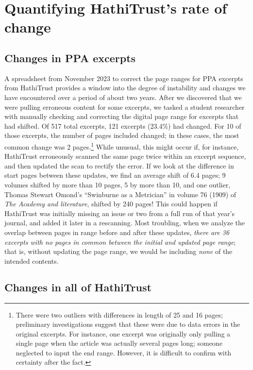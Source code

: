 \documentclass{anthology-ch}         %
\begin{document}
\section{Quantifying HathiTrust’s rate of change}

\subsection{Changes in PPA excerpts}

A spreadsheet from November 2023 to correct the page ranges for PPA excerpts from HathiTrust provides a window into the degree of instability and changes we have encountered over a period of about two years. After we discovered that we were pulling erroneous content for some excerpts, we tasked a student researcher with manually checking and correcting the digital page range for excerpts that had shifted. Of 517 total excerpts, 121 excerpts (23.4\%) had changed. For 10 of those excerpts, the number of pages included changed; in these cases, the most common change was 2 pages.\footnote{There were two outliers with differences in length of 25 and 16 pages; preliminary investigations suggest that these were due to data errors in the original excerpts. For instance, one excerpt was originally only pulling a single page when the article was actually several pages long; someone neglected to input the end range. However, it is difficult to confirm with certainty after the fact.} While unusual, this might occur if, for instance, HathiTrust erroneously scanned the same page twice within an excerpt sequence, and then updated the scan to rectify the error. If we look at the difference in start pages between these updates, we find an average shift of 6.4 pages; 9 volumes shifted by more than 10 pages, 5 by more than 10, and one outlier, Thomas Stewart Omond’s “Swinburne as a Metrician” in volume 76 (1909) of \textit{The Academy and literature}\cite{omond_thomas_stewart_swinburne_1909}, shifted by 240 pages! This could happen if HathiTrust was initially missing an issue or two from a full run of that year’s journal, and added it later in a rescanning. Most troubling, when we analyze the overlap between pages in range before and after these updates, \textit{there are 36 excerpts with no pages in common between the initial and updated page range}; that is, without updating the page range, we would be including \textit{none} of the intended contents.

\subsection{Changes in all of HathiTrust}
\end{document}

